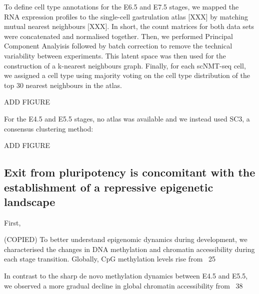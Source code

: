 To define cell type annotations for the E6.5 and E7.5 stages, we mapped the RNA expression profiles to the single-cell gastrulation atlas [XXX] by matching mutual nearest neighbours [XXX]. In short, the count matrices for both data sets were concatenated and normalised together. Then, we performed Principal Component Analyisis followed by batch correction to remove the technical variability between experiments. This latent space was then used for the construction of a k-nearest neighbours graph. Finally, for each scNMT-seq cell, we assigned a cell type using majority voting on the cell type distribution of the top 30 nearest neighbours in the atlas.

	ADD FIGURE

For the E4.5 and E5.5 stages, no atlas was available and we instead used SC3, a consensus clustering method:

	ADD FIGURE

\subsection{Exit from pluripotency is concomitant with the establishment of a repressive epigenetic landscape}
First, 

(COPIED) To better understand epigenomic dynamics during development, we characterised the changes in DNA methylation and chromatin accessibility during each stage transition. Globally, CpG methylation levels rise from ~25%

In contrast to the sharp de novo methylation dynamics between E4.5 and E5.5, we observed a more gradual decline in global chromatin accessibility from ~38%

